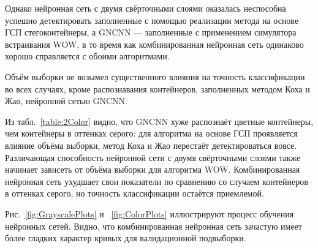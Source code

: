 Однако нейронная сеть с двумя свёрточными слоями оказалась неспособна успешно детектировать заполненные с помощью реализации метода на основе ГСП стегоконтейнеры, а GNCNN --- заполненные с применением симулятора встраивания WOW, в то время как комбинированная нейронная сеть одинаково хорошо справляется с обоими алгоритмами.

Объём выборки не возымел существенного влияния на точность классификации во всех случаях, кроме распознавания контейнеров, заполненных методом Коха и Жао, нейронной сетью GNCNN.

Из табл.~\ref{table:2Color} видно, что GNCNN хуже распознаёт цветные контейнеры, чем контейнеры в оттенках серого: для алгоритма на основе ГСП проявляется влияние объёма выборки, метод Коха и Жао перестаёт детектироваться вовсе. Различающая способность нейронной сети с двумя свёрточными слоями также начинает зависеть от объёма выборки для алгоритма WOW. Комбинированная нейронная сеть ухудшает свои показатели по сравнению со случаем контейнеров в оттенках серого, но точность классификации остаётся приемлемой.

Рис.~\ref{fig:GrayscalePlots} и ~\ref{fig:ColorPlots} иллюстрируют процесс обучения нейронных сетей. Видно, что комбинированная нейронная сеть зачастую имеет более гладких характер кривых для валидационной подвыборки.

